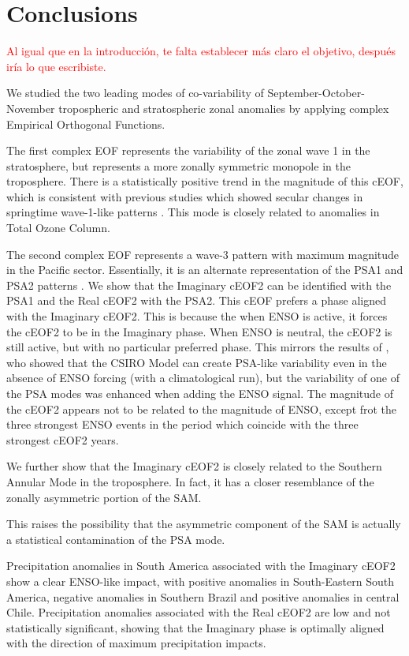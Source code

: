 \documentclass[smallextended]{svjour3}       %
\begin{document}
\hypertarget{conclusions}{%
\section{Conclusions}\label{conclusions}}

\textcolor{red}{Al igual que en la introducción, te falta establecer más claro el objetivo, después iría lo que escribiste.}

We studied the two leading modes of co-variability of September-October-November tropospheric and stratospheric zonal anomalies by applying complex Empirical Orthogonal Functions.

The first complex EOF represents the variability of the zonal wave 1 in the stratosphere, but represents a more zonally symmetric monopole in the troposphere.
There is a statistically positive trend in the magnitude of this cEOF, which is consistent with previous studies which showed secular changes in springtime wave-1-like patterns \citep[e.g.][]{raphael2003}.
This mode is closely related to anomalies in Total Ozone Column.

The second complex EOF represents a wave-3 pattern with maximum magnitude in the Pacific sector.
Essentially, it is an alternate representation of the PSA1 and PSA2 patterns \citep{mo2001}.
We show that the Imaginary cEOF2 can be identified with the PSA1 and the Real cEOF2 with the PSA2.
This cEOF prefers a phase aligned with the Imaginary cEOF2.
This is because the when ENSO is active, it forces the cEOF2 to be in the Imaginary phase.
When ENSO is neutral, the cEOF2 is still active, but with no particular preferred phase.
This mirrors the results of \citet{cai2002}, who showed that the CSIRO Model can create PSA-like variability even in the absence of ENSO forcing (with a climatological run), but the variability of one of the PSA modes was enhanced when adding the ENSO signal. The magnitude of the cEOF2 appears not to be related to the magnitude of ENSO, except frot the three strongest ENSO events in the period which coincide with the three strongest cEOF2 years.

We further show that the Imaginary cEOF2 is closely related to the Southern Annular Mode in the troposphere.
In fact, it has a closer resemblance of the zonally asymmetric portion of the SAM.

This raises the possibility that the asymmetric component of the SAM is actually a statistical contamination of the PSA mode.

Precipitation anomalies in South America associated with the Imaginary cEOF2 show a clear ENSO-like impact, with positive anomalies in South-Eastern South America, negative anomalies in Southern Brazil and positive anomalies in central Chile.
Precipitation anomalies associated with the Real cEOF2 are low and not statistically significant, showing that the Imaginary phase is optimally aligned with the direction of maximum precipitation impacts.
\end{document}
